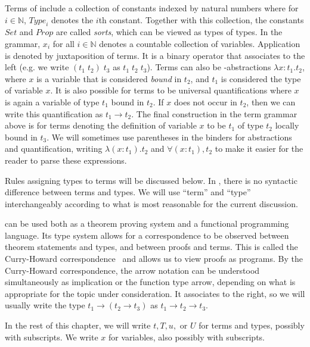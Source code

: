 Terms of \coc{} include a collection of constants indexed by natural numbers where for $i \in \mathbb{N}$, $\mathit{Type}_i$ denotes the $i$th constant. Together with this collection, the constants $\mathit{Set}$ and $\mathit{Prop}$ are called \emph{sorts}, which can be viewed as types of types. In the grammar, $x_i$ for all $i \in \mathbb{N}$ denotes a countable collection of variables. Application is denoted by juxtaposition of terms. It is a binary operator that associates to the left (e.g. we write $(t_1 \; t_2) \; t_3$ as $t_1 \; t_2 \; t_3$). Terms can also be \lambda-abstractions $\lambda x : t_1 . t_2$, where $x$ is a variable that is considered \emph{bound} in $t_2$, and $t_1$ is considered the type of variable $x$. It is also possible for terms to be universal quantifications where $x$ is again a variable of type $t_1$ bound in $t_2$. If $x$ does not occur in $t_2$, then we can write this quantification as $t_1 \rightarrow t_2$. The final construction in the term grammar above is for terms denoting the definition of variable $x$ to be $t_1$ of type $t_2$ locally bound in $t_3$. We will sometimes use parentheses in the binders for abstractions and quantification, writing $\lambda (x  : t_1) . t_2$ and $\forall (x : t_1) , t_2$ to make it easier for the reader to parse these expressions.

Rules assigning types to terms will be discussed below. In \coc{}, there is no syntactic difference between terms and types. We will use ``term'' and ``type'' interchangeably according to what is most reasonable for the current discussion.

\coc{} can be used both as a theorem proving system and a functional programming language. Its type system allows for a correspondence to be observed between theorem statements and types, and between proofs and terms. This is called the Curry-Howard correspondence~\cite{Howard80} and allows us to view proofs as programs. By the Curry-Howard correspondence, the arrow notation can be understood simultaneously as implication or the function type arrow, depending on what is appropriate for the topic under consideration. It associates to the right, so we will usually write the type $t_1 \rightarrow (t_2 \rightarrow t_3)$ as $t_1 \rightarrow t_2 \rightarrow t_3$.

In the rest of this chapter, we will write $t, T, u,$ or $U$ for terms and types, possibly with subscripts. We write $x$ for variables, also possibly with subscripts.

